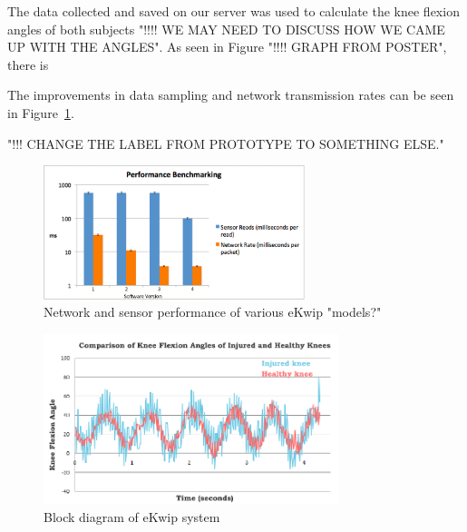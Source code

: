 The data collected and saved on our server was used to calculate the knee flexion angles of both subjects "!!!! WE MAY NEED TO DISCUSS HOW WE CAME UP WITH THE ANGLES". As seen in Figure "!!!! GRAPH FROM POSTER", there is 

The improvements in data sampling and network transmission rates can be seen in Figure~\ref{fig:graph}.

"!!! CHANGE THE LABEL FROM PROTOTYPE TO SOMETHING ELSE."

\begin{figure}[h]
  \begin{center}
    \includegraphics[width=3in]{images/graph.png}
  \end{center}
  \caption{Network and sensor performance of various eKwip "models?"}
  \label{fig:graph}
\end{figure}






\begin{figure}[h]
  \begin{center}
    \includegraphics[width=3.4in]{images/results_graph.PNG}
  \end{center}
  \caption{Block diagram of eKwip system}
  \label{fig:results_graph}
\end{figure}